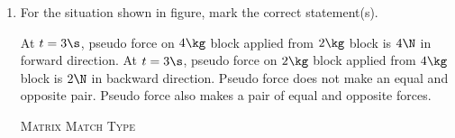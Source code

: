 \documentclass{article}
\renewcommand{\ans}{\quad}
\begin{document}
\begin{enumerate}
    \item For the situation shown in figure, mark the correct statement(s).
    \begin{center}
    \end{center}
    \begin{tasks}
        \task At $t=3\s$, pseudo force on $4\kg$ block applied from $2\kg$ block is $4\N$ in forward direction.
        \task At $t=3\s$, pseudo force on $2\kg$ block applied from $4\kg$ block is $2\N$ in backward direction.\ans
        \task Pseudo force does not make an equal and opposite pair.\ans
        \task Pseudo force also makes a pair of equal and opposite forces.
    \end{tasks}


    \begin{center}
        \textsc{Matrix Match Type}
    \end{center}


\end{enumerate}
\end{document}
